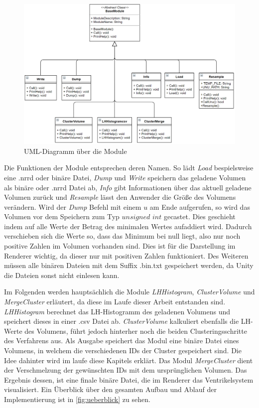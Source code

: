 \begin{figure}
\centering 
\includegraphics[width=\textwidth]{Logos/Modules_UML.PNG}
\caption{UML-Diagramm über die Module} 
\label{fig:modul_uml} 
\end{figure}


Die Funktionen der Module entsprechen deren Namen. So lädt \textit{Load} bespielsweise eine .nrrd oder binäre Datei, \textit{Dump} und \textit{Write} speichern das geladene Volumen als binäre oder .nrrd Datei ab, \textit{Info} gibt Informationen über das aktuell geladene Volumen zurück und \textit{Resample} lässt den Anwender die Größe des Volumens verändern.
\newline
Wird der \textit{Dump} Befehl mit einem $u$ am Ende aufgerufen, so wird das Volumen vor dem Speichern zum Typ $unsigned$ $int$ gecastet. Dies geschieht indem auf alle Werte der Betrag des minimalen Wertes aufaddiert wird. Dadurch verschieben sich die Werte so, dass das Minimum bei null liegt, also nur noch positive Zahlen im Volumen vorhanden sind. Dies ist für die Darstellung im Renderer wichtig, da dieser nur mit positiven Zahlen funktioniert. Des Weiteren müssen alle binären Dateien mit dem Suffix .bin.txt gespeichert werden, da Unity die Dateien sonst nicht einlesen kann.


Im Folgenden werden hauptsächlich die Module \textit{LHHistogram}, \textit{ClusterVolume} und \textit{MergeCluster} erläutert, da diese im Laufe dieser Arbeit entstanden sind. \textit{LHHistogram} berechnet das LH-Histogramm des geladenen Volumens und speichert dieses in einer .csv Datei ab. \textit{ClusterVolume} kalkuliert ebenfalls die LH-Werte des Volumens, führt jedoch hinterher noch die beiden Clusteringsschritte des Verfahrens aus. Als Ausgabe speichert das Modul eine binäre Datei eines Volumens, in welchem die verschiedenen IDs der Cluster gespeichert sind. Die Idee dahinter wird im laufe diese Kapitels erklärt. Das Modul \textit{MergeCluster} dient der Verschmelzung der gewünschten IDs mit dem ursprünglichen Volumen. Das Ergebnis dessen, ist eine finale binäre Datei, die im Renderer das Ventrikelsystem visualisiert. Ein Überblick über den gesamten Aufbau und Ablauf der Implementierung ist in  \autoref{fig:ueberblick} zu sehen.

